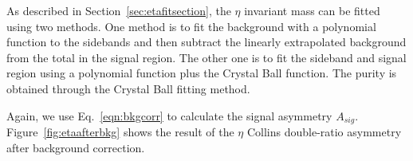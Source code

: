 As described in Section~\ref{sec:etafitsection}, the $\eta$ invariant mass can be fitted using two methods. One method is to fit the background with a polynomial function to the sidebands and then subtract the linearly extrapolated background from the total in the signal region. The other one is to fit the sideband and signal region using a polynomial function plus the Crystal Ball function. The purity is obtained through the Crystal Ball fitting method.%

Again, we use Eq.~\eqref{eqn:bkgcorr} to calculate the signal asymmetry $A_{sig}$. Figure~\ref{fig:etaafterbkg} shows the result of the $\eta$ Collins double-ratio asymmetry after background correction. 

